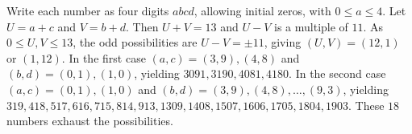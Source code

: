 Write each number as four digits $abcd$, allowing initial zeros, with $0\le a\le4$. Let $U=a+c$ and $V=b+d$. Then $U+V=13$ and $U-V$ is a multiple of $11$. As $0\le U,V\le13$, the odd possibilities are $U-V=\pm11$, giving $(U,V)=(12,1)$ or $(1,12)$. In the first case $(a,c)=(3,9),(4,8)$ and $(b,d)=(0,1),(1,0)$, yielding $3091,3190,4081,4180$. In the second case $(a,c)=(0,1),(1,0)$ and $(b,d)=(3,9),(4,8),\ldots,(9,3)$, yielding $319,418,517,616,715,814,913,1309,1408,1507,1606,1705,1804,1903$. These $18$ numbers exhaust the possibilities.
